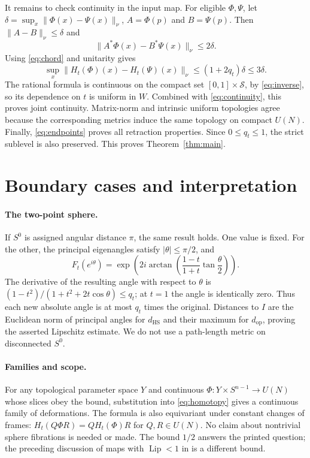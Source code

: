 \documentclass[11pt]{article}
\newcommand{\Lip}{\operatorname{Lip}}
\newcommand{\op}{\mathrm{op}}
\newcommand{\HS}{\mathrm{HS}}
\begin{document}
It remains to check continuity in the input map. For eligible $\Phi,\Psi$, let
$\delta=\sup_x\|\Phi(x)-\Psi(x)\|_\nu$, $A=\Phi(p)$ and $B=\Psi(p)$. Then $\|A-B\|_\nu\le\delta$ and
\[
 \|A^*\Phi(x)-B^*\Psi(x)\|_\nu\le2\delta.
\]
Using \eqref{eq:chord} and unitarity gives
\begin{equation}\label{eq:continuity}
 \sup_x\|H_t(\Phi)(x)-H_t(\Psi)(x)\|_\nu
 \le(1+2q_t)\delta\le3\delta.
\end{equation}
The rational formula is continuous on the compact set $[0,1]\times\mathcal S$, by \eqref{eq:inverse}, so its dependence on $t$ is uniform in $W$. Combined with \eqref{eq:continuity}, this proves joint continuity. Matrix-norm and intrinsic uniform topologies agree because the corresponding metrics induce the same topology on compact $U(N)$. Finally, \eqref{eq:endpoints} proves all retraction properties. Since $0\le q_t\le1$, the strict sublevel is also preserved. This proves Theorem~\ref{thm:main}.

\section{Boundary cases and interpretation}
\paragraph{The two-point sphere.}
If $S^0$ is assigned angular distance $\pi$, the same result holds. One value is fixed. For the other, the principal eigenangles satisfy $|\theta|\le\pi/2$, and
\[
 F_t(e^{i\theta})=\exp\!\left(2i\arctan\!\left(\frac{1-t}{1+t}\tan\frac\theta2\right)\right).
\]
The derivative of the resulting angle with respect to $\theta$ is $(1-t^2)/(1+t^2+2t\cos\theta)\le q_t$; at $t=1$ the angle is identically zero. Thus each new absolute angle is at most $q_t$ times the original. Distances to $I$ are the Euclidean norm of principal angles for $d_{\HS}$ and their maximum for $d_{\op}$, proving the asserted Lipschitz estimate. We do not use a path-length metric on disconnected $S^0$.

\paragraph{Families and scope.}
For any topological parameter space $Y$ and continuous $\Phi:Y\times S^{n-1}\to U(N)$ whose slices obey the bound, substitution into \eqref{eq:homotopy} gives a continuous family of deformations. The formula is also equivariant under constant changes of frames: $H_t(Q\Phi R)=QH_t(\Phi)R$ for $Q,R\in U(N)$. No claim about nontrivial sphere fibrations is needed or made. The bound $1/2$ answers the printed question; the preceding discussion of maps with $\Lip<1$ in \cite{gromov} is a different bound.
\end{document}
